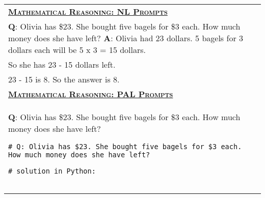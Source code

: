 \begin{table}[htbp]
    \centering
    \begin{tabular}{p{}}
        \toprule
        \underline{\textbf{\textsc{Mathematical Reasoning: NL Prompts}}} \\
\textbf{Q}: Olivia has \$23. She bought five bagels for \$3 each. How much money does she have left?
\textbf{A}: Olivia had 23 dollars. 5 bagels for 3 dollars each will be 5 x 3 = 15 dollars. \\
So she has 23 - 15 dollars left.  \\
23 - 15 is 8. So the answer is 8. \\
        \midrule
        \underline{\textbf{\textsc{Mathematical Reasoning: PAL Prompts}}} \\
 \textbf{Q}: Olivia has \$23. She bought five bagels for \$3 each. How much money does she have left?
\begin{verbatim}
# Q: Olivia has $23. She bought five bagels for $3 each. How much money does she have left?

# solution in Python:


\end{verbatim}
\end{tabular}
\end{table}
